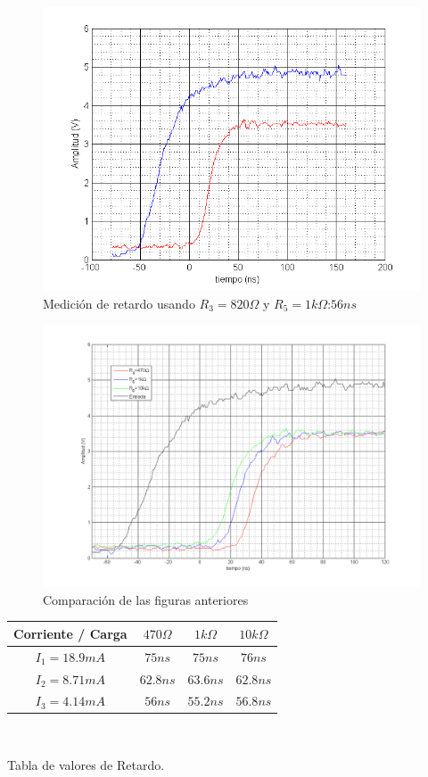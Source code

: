\documentclass[12pt,a4paper]{article}
\begin{document}
\begin{figure}[H]
\centering
\includegraphics[width=\textwidth]{img/Delay3.png}
\caption{Medición de retardo usando $R_3=820\Omega$ y $R_5=1k\Omega$:$56ns$}
\end{figure}

\begin{figure}[H]
\centering
\includegraphics[width=\textwidth]{img/compDelay.png}
\caption{Comparación de las figuras anteriores}
\end{figure}

{\centering
\begin{tabular}{| c | c | c | c |} \hline
Corriente / Carga & $470\Omega$ & $1k\Omega$ & $10k\Omega$ \\ \hline
$I_1=18.9mA$ & $75ns$ & $75ns$ & $76ns$ \\ \hline 
$I_2=8.71mA$ & $62.8ns$ & $63.6ns$ & $62.8ns$ \\ \hline 
$I_3=4.14mA$ & $56ns$ & $55.2ns$ & $56.8ns$ \\ \hline 
\end{tabular}\\}
{\centering Tabla de valores de Retardo.\\}
\end{document}
